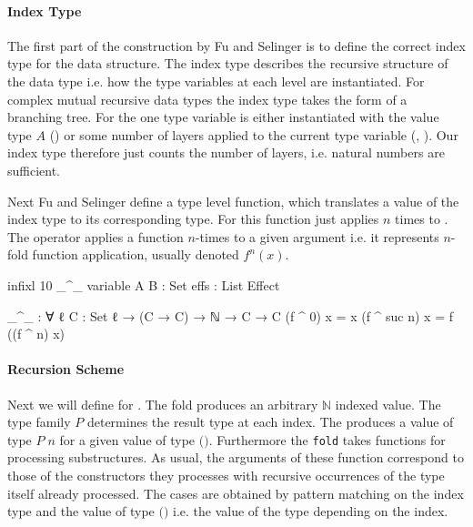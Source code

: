 \paragraph{Index Type} The first part of the construction by Fu and Selinger is
to define the correct index type for the data structure.
The index type describes the recursive structure of the data type i.e. how the
type variables at each level are instantiated.
For complex mutual recursive data types the index type takes the form of a
branching tree.
For \AgdaSpace{}
the one type variable is either instantiated with the value type $A$
() or some number of
\AgdaSpace{} layers applied to
the current type variable (,
).
Our index type therefore just counts the number of
\AgdaSpace{} layers, i.e. natural numbers
are sufficient.

Next Fu and Selinger define a type level function, which translates a value of
the index type to its corresponding type.
For 
\AgdaSpace{}\AgdaSpace{}
this function just applies \AgdaSpace{}
$n$ times to .
The operator \AgdaFunction{\_\textasciicircum\_} applies a function $n$-times to
a given argument  i.e. it represents $n$-fold function
application, usually denoted $f^n(x)$.

\begin{code}[hide]
infixl 10 _^_
variable
  A B : Set
  effs : List Effect
\end{code}
\begin{code}
_^_ : ∀ {ℓ} {C : Set ℓ} → (C → C) → ℕ → C → C
(f ^ 0)      x = x
(f ^ suc n)  x = f ((f ^ n) x)
\end{code}

\paragraph{Recursion Scheme} Next we will define  for
\AgdaSpace{}\AgdaSpace{}.
The fold produces an arbitrary $\mathbb{N}$ indexed value.
The type family $P$ determines the result type at each index.
The  produces a value of type $P\;n$ for a given value of
type
$($\AgdaSpace{}\AgdaSpace{}\AgdaFunction{\textasciicircum}\AgdaSpace{}$)$\AgdaSpace{}.
Furthermore the \texttt{fold} takes functions for processing substructures.
As usual, the arguments of these function correspond to those of the
constructors they processes with recursive occurrences of the type itself already
processed.
The cases are obtained by pattern matching on the index type and the value of
type
$($\AgdaSpace{}\AgdaSpace{}\AgdaFunction{\textasciicircum}\AgdaSpace{}$)$\AgdaSpace{}
i.e. the value of the type depending on the index.

